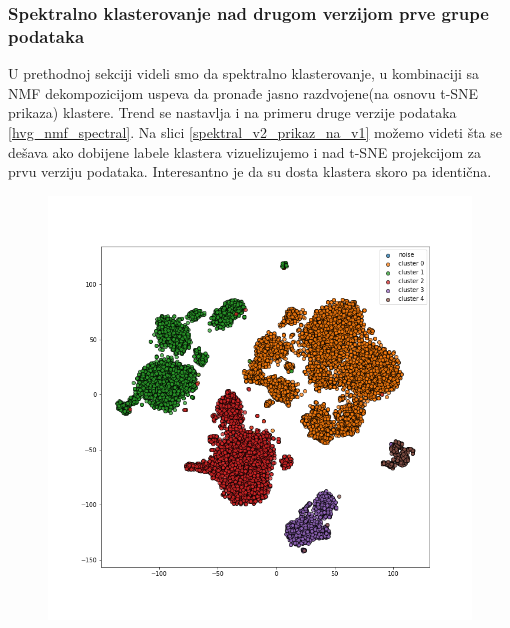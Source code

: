 \documentclass[a4paper]{article}
\begin{document}
\subsubsection{Spektralno klasterovanje nad drugom verzijom prve grupe podataka}

U prethodnoj sekciji videli smo da spektralno klasterovanje, u kombinaciji sa NMF dekompozicijom uspeva da pronađe jasno razdvojene(na osnovu t-SNE prikaza) klastere. Trend se nastavlja i na primeru druge verzije podataka \ref{hvg_nmf_spectral}. Na slici \ref{spektral_v2_prikaz_na_v1} možemo videti šta se dešava ako dobijene labele klastera vizuelizujemo i nad t-SNE projekcijom za prvu verziju podataka. Interesantno je da su dosta klastera skoro pa identična.

\begin{figure}[ht]
	\centering
	\includegraphics[scale=0.25]{spektral_v2_5}

\end{figure}
\end{document}
